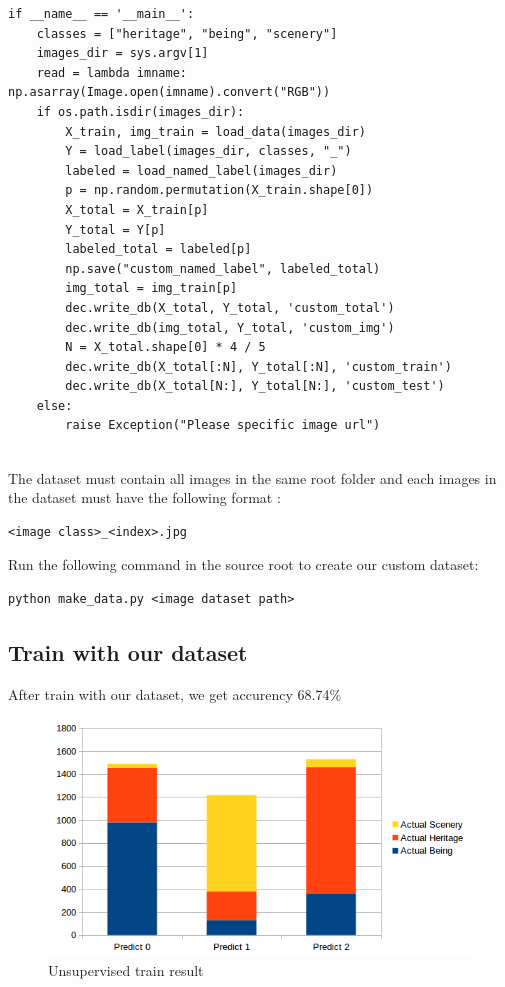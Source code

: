 \documentclass[hidelinks,12pt,a4paper]{report}
\begin{document}
\begin{lstlisting}
if __name__ == '__main__':
    classes = ["heritage", "being", "scenery"]
    images_dir = sys.argv[1]
    read = lambda imname: np.asarray(Image.open(imname).convert("RGB"))
    if os.path.isdir(images_dir):
        X_train, img_train = load_data(images_dir)
        Y = load_label(images_dir, classes, "_")
        labeled = load_named_label(images_dir)
        p = np.random.permutation(X_train.shape[0])
        X_total = X_train[p]
        Y_total = Y[p]
        labeled_total = labeled[p]
        np.save("custom_named_label", labeled_total)
        img_total = img_train[p]
        dec.write_db(X_total, Y_total, 'custom_total')
        dec.write_db(img_total, Y_total, 'custom_img')
        N = X_total.shape[0] * 4 / 5
        dec.write_db(X_total[:N], Y_total[:N], 'custom_train')
        dec.write_db(X_total[N:], Y_total[N:], 'custom_test')
    else:
        raise Exception("Please specific image url")


\end{lstlisting}
The dataset must contain all images in the same root folder and each images in the dataset must have the following format :
\begin{verbatim}
<image class>_<index>.jpg
\end{verbatim}
Run the following command in the source root to create our custom dataset: 
\begin{verbatim}
python make_data.py <image dataset path>
\end{verbatim}
\subsection{Train with our dataset}
After train with our dataset, we get accurency 68.74\%

\begin{figure}[H]
\centering
\includegraphics[width=1\textwidth]{images/unsupervised_large_dataset_result}
\caption{Unsupervised train result}
\end{figure}
\end{document}
